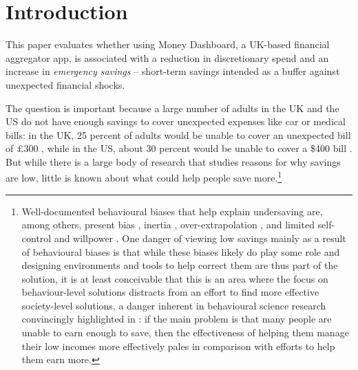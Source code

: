 
\section{Introduction}%
\label{sec:introduction}

This paper evaluates whether using Money Dashboard, a UK-based financial
aggregator app, is associated with a reduction in discretionary spend and an
increase in \textit{emergency savings} -- short-term savings intended as a
buffer against unexpected financial shocks.

The question is important because a large number of adults in the UK and the US
do not have enough savings to cover unexpected expenses like car or medical
bills: in the UK, 25 percent of adults would be unable to cover an unexpected
bill of \pounds300 \citep{phillips2021supporting}, while in the US, about 30
percent would be unable to cover a \$400 bill \citep{fed2022economic}. But
while there is a large body of research that studies reasons for why savings
are low, little is known about what could help people save
more.\footnote{Well-documented behavioural biases that help explain undersaving
    are, among others, present bias \citep{laibson1997golden,
    ericson2019intertemporal}, inertia \citep{madrian2001power},
    over-extrapolation \citep{choi2009reinforcement}, and limited self-control
    and willpower \citep{thaler1981economic, benhabib2005modeling,
    fudenberg2006dual, loewenstein2004animal, gul2001temptation}. One danger of
    viewing low savings mainly as a result of behavioural biases is that while
    these biases likely do play some role and designing environments and tools
    to help correct them are thus part of the solution, it is at least
    conceivable that this is an area where the focus on behaviour-level
    solutions distracts from an effort to find more effective society-level
    solutions, a danger inherent in behavioural science research convincingly
    highlighted in \citet{chater2022frame}: if the main problem is that many
people are unable to earn enough to save, then the effectiveness of helping
them manage their low incomes more effectively pales in comparison with efforts
to help them earn more.}

